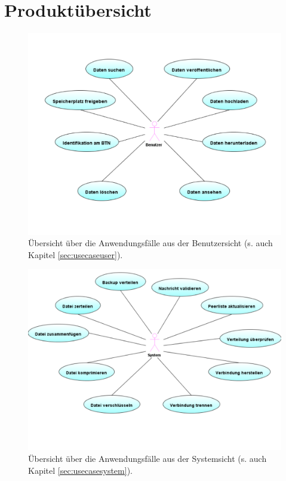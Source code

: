 \section{Produktübersicht}

\begin{center}

	\begin{figure}[hpt]
		\includegraphics[scale=0.7]{Produktuebersicht.pdf}
		\caption{Übersicht über die Anwendungsfälle aus der Benutzersicht (s. auch Kapitel \ref{sec:usecaseuser}).}
	\end{figure}

	\begin{figure}[hpt]
		\includegraphics[scale=0.7]{SystemUseCases.pdf}
		\caption{Übersicht über die Anwendungsfälle aus der Systemsicht (s. auch Kapitel \ref{sec:usecasesystem}).}
	\end{figure}

\end{center}
